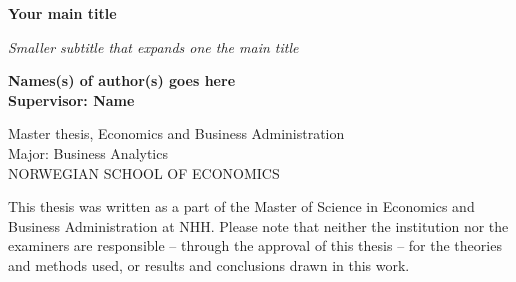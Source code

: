 
\begin{titlepage}
	
	
	\thispagestyle{frontpage}
	
	\begin{center}
		
		\vspace*{6\baselineskip}
	
		
		{\Huge \textbf{Your main title\\}}
		
		\large{\textit{Smaller subtitle that expands one the main title}}\\
		
        \vspace*{1,5\baselineskip}

		\large{\textbf{Names(s) of author(s) goes here}}\\
		\large{\textbf{Supervisor: Name}}\\
		
		\vspace{1,5\baselineskip}
		
		\large{Master thesis, Economics and Business
Administration}\\
		\large{Major: Business Analytics}\\
		
		\vspace{1,5\baselineskip}
		\large{NORWEGIAN SCHOOL OF ECONOMICS}\\

	\end{center}
	
	\vspace*{4\baselineskip}
	{This thesis was written as a part of the Master of Science in Economics and Business Administration at NHH. Please note that neither the institution nor the examiners are
responsible – through the approval of this thesis – for the theories and methods used, or
results and conclusions drawn in this work.}
	
\end{titlepage}
